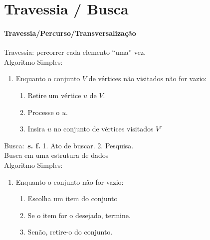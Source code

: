 
\section{Travessia / Busca}
\begin{frame}[label=notas]
	\framesubtitle{Travessia/Percurso/Transversalização}

	Travessia: percorrer cada elemento ``uma'' vez.
	\\\vfill\pause
	Algoritmo Simples:\pause
	\begin{enumerate}
		\item Enquanto o conjunto $V$ de vértices não visitados não for vazio:
			\begin{enumerate}
				\item Retire um vértice $u$ de $V$.
				\item Processe o $u$.
				\item Insira $u$ no conjunto de vértices visitados $V'$
			\end{enumerate}
	\end{enumerate}
\end{frame}

\begin{frame}[label=notas]
	Busca:\pause\ \textbf{s. f.} 1. Ato de buscar. 2. Pesquisa.
	\\\vfill\pause
	Busca em uma estrutura de dados\pause
	\\\vfill
	Algoritmo Simples:\pause
	\begin{enumerate}
		\item Enquanto o conjunto não for vazio:
			\begin{enumerate}
				\item \alert<6>{Escolha} um item do conjunto
				\item Se o item for o desejado, termine.
				\item Senão, retire-o do conjunto.
			\end{enumerate}
	\end{enumerate}
\end{frame}

